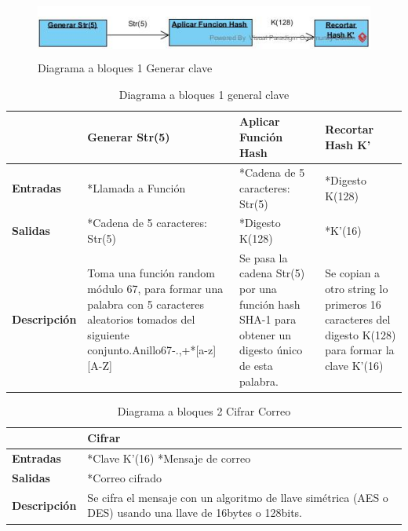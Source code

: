\documentclass[12pt,oneside,onecolumn,openany]{report}
\begin{document}
\newpage
\newpage
\begin{figure}[H]
	\includegraphics[width=1\linewidth, height=2cm]{./images/bloques1.jpg}
	\caption{Diagrama a bloques 1 Generar clave}
	\label{fig:5-2-1}
\end{figure}
\begin{table}[H]
 \centering
   {
     \begin{tabular}{| p{4cm} | p{4cm} | p{4cm} | p{4cm} |}
     \hline
     & \textbf{Generar Str(5)} & \textbf{Aplicar Función Hash} & \textbf{Recortar Hash K’}\\
     \hline
     \textbf{Entradas} & *Llamada a Función & *Cadena de 5 caracteres: Str(5) & *Digesto K(128)\\
     \hline
     \textbf{Salidas} & *Cadena de 5 caracteres: Str(5) & *Digesto K(128) & *K’(16)\\
     \hline
     \textbf{Descripción} & Toma una función random módulo 67, para formar una palabra con 5 caracteres aleatorios tomados del siguiente conjunto.Anillo67{-.,+*[a-z][A-Z]} & Se pasa la cadena Str(5) por una función hash SHA-1 para obtener un digesto único de esta palabra. & Se copian a otro string lo primeros 16 caracteres del digesto K(128) para formar la clave K’(16)\\

    \end{tabular}
    }
    \caption{Diagrama a bloques 1 general clave}
    \label{tabla:b1}
\end{table}

\begin{table}[H]
 \centering
   {
     \begin{tabular}{| p{3cm} | p{3cm} |}
     \hline
     & \textbf{Cifrar}\\
     \hline
     \textbf{Entradas} & *Clave K’(16) *Mensaje de correo\\
     \hline
     \textbf{Salidas} & *Correo cifrado\\
     \hline
     \textbf{Descripción} & Se cifra el mensaje con un algoritmo de llave simétrica (AES o DES) usando una llave de 16bytes o 128bits.\\

    \end{tabular}
    }
    \caption{Diagrama a bloques 2 Cifrar Correo}
    \label{tabla:b2}
\end{table}
\end{document}
